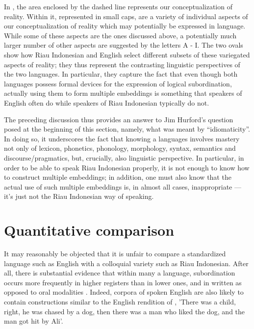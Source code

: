 \documentclass[output=paper,colorlinks,citecolor=brown
]{langscibook}
\begin{document}
In , the area enclosed by the dashed line represents our conceptualization of reality.  Within it, represented in small caps, are a variety of individual aspects of our conceptualization of reality which may potentially be expressed in language.  While some of these aspects are the ones discussed above, a potentially much larger number of other aspects are suggested by the letters A - I.  The two ovals show how Riau Indonesian and English select different subsets of these variegated aspects of reality; they thus represent the contrasting linguistic perspectives of the two languages.  In particular, they capture the fact that even though both languages possess formal devices for the expression of logical subordination, actually using them to form multiple embeddings is something that speakers of English often do while speakers of Riau Indonesian typically do not.

The preceding discussion thus provides an answer to Jim Hurford's question posed at the beginning of this section, namely, what was meant by ``idiomaticity''.  In doing so, it underscores the fact that knowing a languages involves mastery not only of lexicon, phonetics, phonology, morphology, syntax, semantics and discourse/pragmatics, but, crucially, also linguistic perspective.  In particular, in order to be able to speak Riau Indonesian properly, it is not enough to know how to construct multiple embeddings; in addition, one must also know that the actual use of such multiple embeddings is, in almost all cases, inappropriate — it's just not the Riau Indonesian way of speaking.

\section{Quantitative comparison}
It may reasonably be objected that it is unfair to compare a standardized language such as English with a colloquial variety such as Riau Indonesian.  After all, there is substantial evidence that within many a language, subordination occurs more frequently in higher registers than in lower ones, and in written as opposed to oral modalities \citep[and others]{givon1979understanding,deutscher2000syntactic,karlsson2009aorigin,karlsson2009bsyntactic}. Indeed, corpora of spoken English are also likely to contain constructions similar to the English rendition of , 'There was a child, right, he was chased by a dog, then there was a man who liked the dog, and the man got hit by Ali'. 
\end{document}
